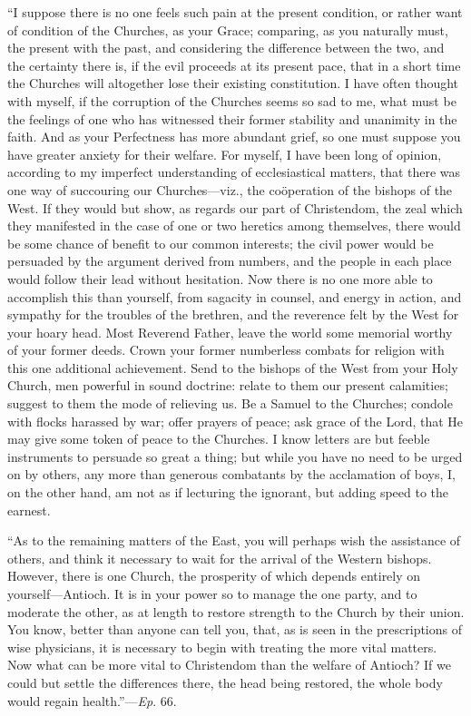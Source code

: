 ``I suppose there is no one feels such pain at the present
condition, or rather want of condition of the Churches, as your Grace;
comparing, as you naturally must, the present with the past, and
considering the difference between the two, and the certainty there
is, if the evil proceeds at its present pace, that in a short time the
Churches will altogether lose their existing constitution. I have
often thought with myself, if the corruption of the Churches seems so
sad to me, what must be the feelings of one who has witnessed their
former stability and unanimity in the faith. And as your Perfectness
has more abundant grief, so one must suppose you have greater anxiety
for their welfare. For myself, I have been long of opinion, according
to my imperfect understanding of ecclesiastical matters, that there
was one way of succouring our Churches—viz., the coöperation of the
bishops of the West. If they would but show, as regards our part of
Christendom, the zeal which they manifested in the case of one or two
heretics among themselves, there would be some chance of benefit to
our common interests; the civil power would be persuaded by the
argument derived from numbers, and the people in each place would
follow their lead without hesitation. Now there is no one more able to
accomplish this than yourself, from sagacity in counsel, and energy in
action, and sympathy for the troubles of the brethren, and the
reverence felt by the West for your hoary head. Most Reverend Father,
leave the world some memorial worthy of your former deeds. Crown your
former numberless combats for religion with this one additional
achievement. Send to the bishops of the West from
your Holy Church, men powerful in sound doctrine: relate to them our
present calamities; suggest to them the mode of relieving us. Be a
Samuel to the Churches; condole with flocks harassed by war; offer
prayers of peace; ask grace of the Lord, that He may give some token
of peace to the Churches. I know letters are but feeble instruments to
persuade so great a thing; but while you have no need to be urged on
by others, any more than generous combatants by the acclamation of
boys, I, on the other hand, am not as if lecturing the ignorant, but
adding speed to the earnest.

``As to the remaining matters of the East, you will perhaps
wish the assistance of others, and think it necessary to wait for the
arrival of the Western bishops. However, there is one Church, the
prosperity of which depends entirely on yourself—Antioch. It is in
your power so to manage the one party, and to moderate the other, as
at length to restore strength to the Church by their union. You know,
better than anyone can tell you, that, as is seen in the prescriptions
of wise physicians, it is necessary to begin with treating the more
vital matters. Now what can be more vital to Christendom than the
welfare of Antioch? If we could but settle the differences there, the
head being restored, the whole body would regain health.''—\emph{Ep}.
66.

